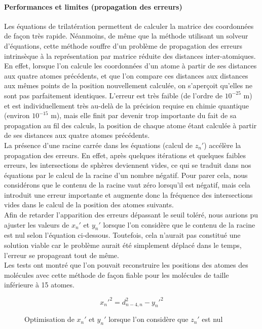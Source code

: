\paragraph{Performances et limites (propagation des erreurs)}
\par Les équations de trilatération permettent de calculer la matrice des coordonnées de façon très rapide. Néanmoins, de même que la méthode utilisant un solveur d'équations, cette méthode souffre d'un problème de propagation des erreurs intrinsèque à la représentation par matrice réduite des distances inter-atomiques. En effet, lorsque l'on calcule les coordonnées d'un atome à partir de ses distances aux quatre atomes précédents, et que l'on compare ces distances aux distances aux mêmes points de la position nouvellement calculée, on s'aperçoit qu'elles ne sont pas parfaitement identiques. L'erreur est très faible (de l'ordre de $10^{-25}$ m) et est individuellement très au-delà de la précision requise en chimie quantique (environ $10^{-15}$ m), mais elle finit par devenir trop importante du fait de sa propagation au fil des calculs, la position de chaque atome étant calculée à partir de ses distances aux quatre atomes précédents.\\
La présence d'une racine carrée dans les équations (calcul de $z_n'$) accélère la propagation des erreurs. En effet, après quelques itérations et quelques faibles erreurs, les intersections de sphères deviennent vides, ce qui se traduit dans nos équations par le calcul de la racine d'un nombre négatif. Pour parer cela, nous considérons que le contenu de la racine vaut zéro lorsqu'il est négatif, mais cela introduit une erreur importante et augmente donc la fréquence des intersections vides dans le calcul de la position des atomes suivants.\\
Afin de retarder l'apparition des erreurs dépassant le seuil toléré, nous aurions pu ajuster les valeurs de $x_n'$ et $y_n'$ lorsque l'on considère que le contenu de la racine est nul selon l'équation ci-dessous. Toutefois, cela n'aurait pas constitué une solution viable car le problème aurait été simplement déplacé dans le temps, l'erreur se propageant tout de même.\\
Les tests ont montré que l'on pouvait reconstruire les positions des atomes des molécules avec cette méthode de façon fiable pour les molécules de taille inférieure à 15 atomes.

\begin{figure}[!h]
	\centering

	\[
		x_n'^2 = d_{n-4,n}^2 - y_n'^2
	\]

	\caption{Optimisation de $x_n'$ et $y_n'$ lorsque l'on considère que $z_n'$ est nul}
\end{figure}